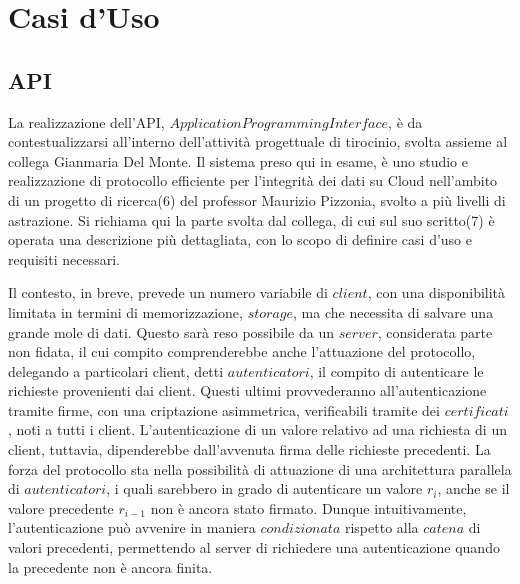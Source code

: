 \section{Casi d'Uso}


	\subsection{API}

	La realizzazione dell'API, $ Application Programming Interface $, è da contestualizzarsi all'interno dell'attività progettuale di tirocinio, svolta assieme al collega Gianmaria Del Monte. Il sistema preso qui in esame, è uno studio e realizzazione di protocollo efficiente per l'integrità dei dati su Cloud nell'ambito di un progetto di ricerca(6) del professor Maurizio Pizzonia, svolto a più livelli di astrazione. Si richiama qui la parte svolta dal collega, di cui sul suo scritto(7) è operata una descrizione più dettagliata, con lo scopo di definire casi d'uso e requisiti necessari.
	
	Il contesto, in breve, prevede un numero variabile di $ client $, con una disponibilità limitata in termini di memorizzazione, $ storage $, ma che necessita di salvare una grande mole di dati. Questo sarà reso possibile da un $ server $, considerata parte non fidata, il cui compito comprenderebbe anche l'attuazione del protocollo, delegando a particolari client, detti $ autenticatori $, il compito di autenticare le richieste provenienti dai client. Questi ultimi provvederanno all'autenticazione tramite firme, con una criptazione asimmetrica, verificabili tramite dei $ certificati $, noti a tutti i client. L'autenticazione di un valore relativo ad una richiesta di un client, tuttavia, dipenderebbe dall'avvenuta firma delle richieste precedenti.
	La forza del protocollo sta nella possibilità di attuazione di una architettura parallela di $ autenticatori $, i quali sarebbero in grado di autenticare un valore $ r_{i} $, anche se il valore precedente $ r_{i-1} $ non è ancora stato firmato. Dunque intuitivamente, l'autenticazione può avvenire in maniera $ condizionata $ rispetto alla $ catena $ di valori precedenti, permettendo al server di richiedere una autenticazione quando la precedente non è ancora finita.
	
